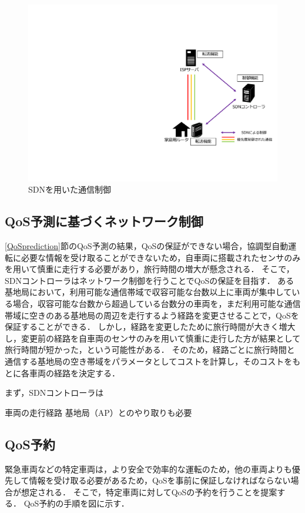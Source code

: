 \documentclass[a4paper,10pt,twocolumn,uplatex]{jsarticle}
\begin{document}
\begin{figure}[t]
	\begin{centering}
    \includegraphics[width=0.7\linewidth]{img/proposal_resume.pdf}
    \caption{SDNを用いた通信制御}
    \label{fig:proposal}
    \end{centering}
\end{figure}

\subsection{QoS予測に基づくネットワーク制御}
\label{priority}
\ref{QoSprediction}節のQoS予測の結果，QoSの保証ができない場合，協調型自動運転に必要な情報を受け取ることができないため，自車両に搭載されたセンサのみを用いて慎重に走行する必要があり，旅行時間の増大が懸念される．
そこで，SDNコントローラはネットワーク制御を行うことでQoSの保証を目指す．
ある基地局において，利用可能な通信帯域で収容可能な台数以上に車両が集中している場合，収容可能な台数から超過している台数分の車両を，まだ利用可能な通信帯域に空きのある基地局の周辺を走行するよう経路を変更させることで，QoSを保証することができる．
しかし，経路を変更したために旅行時間が大きく増大し，変更前の経路を自車両のセンサのみを用いて慎重に走行した方が結果として旅行時間が短かった，という可能性がある．
そのため，経路ごとに旅行時間と通信する基地局の空き帯域をパラメータとしてコストを計算し，そのコストをもとに各車両の経路を決定する．\par

まず，SDNコントローラは

車両の走行経路
基地局（AP）とのやり取りも必要

\subsection{QoS予約}
緊急車両などの特定車両は，より安全で効率的な運転のため，他の車両よりも優先して情報を受け取る必要があるため，QoSを事前に保証しなければならない場合が想定される．
そこで，特定車両に対してQoSの予約を行うことを提案する．
QoS予約の手順を図に示す．
\end{document}
